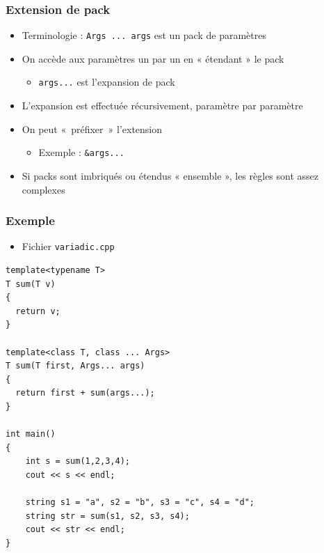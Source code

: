 \begin{frame}
\frametitle{Extension de pack}
\begin{itemize}[<+->]
\item Terminologie : \texttt{Args ... args} est un pack de paramètres
\item On accède aux paramètres un par un en « étendant » le pack
	\begin{itemize}
	\item \texttt{args...} est l'expansion de pack
	\end{itemize}
\item L'expansion est effectuée récursivement, paramètre par paramètre
\item On peut «~préfixer~» l'extension
	\begin{itemize}
	\item Exemple : \texttt{\&args...}
	\end{itemize}
\item Si packs sont imbriqués ou étendus « ensemble », les règles sont assez complexes
\end{itemize}
\end{frame}

\begin{frame}[containsverbatim]
\frametitle{Exemple}
\begin{itemize}
\item Fichier \texttt{variadic.cpp}
\end{itemize}
\begin{lstlisting}
template<typename T>
T sum(T v) 
{
  return v;
}

template<class T, class ... Args>
T sum(T first, Args... args) 
{
  return first + sum(args...);
}

int main()
{
	int s = sum(1,2,3,4);
	cout << s << endl;

	string s1 = "a", s2 = "b", s3 = "c", s4 = "d";
	string str = sum(s1, s2, s3, s4);
	cout << str << endl;		
}
\end{lstlisting}
\end{frame}

